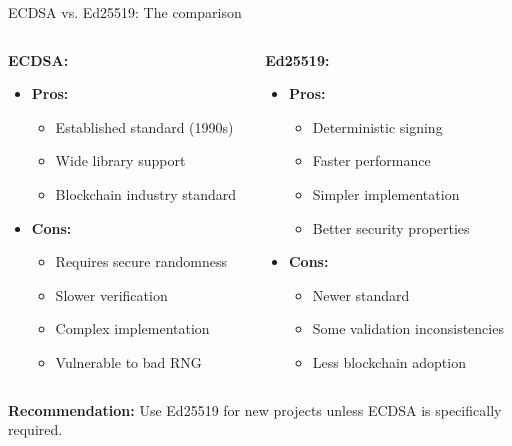 \documentclass[aspectratio=169, lualatex, handout]{beamer}
\begin{document}
\begin{frame}{ECDSA vs. Ed25519: The comparison}
	\begin{columns}
		\begin{column}{0.5\textwidth}
			\textbf{ECDSA:}
			\begin{itemize}[<+->]
				\item \textbf{Pros:}
				      \begin{itemize}
					      \item Established standard (1990s)
					      \item Wide library support
					      \item Blockchain industry standard
				      \end{itemize}
				\item \textbf{Cons:}
				      \begin{itemize}
					      \item Requires secure randomness
					      \item Slower verification
					      \item Complex implementation
					      \item Vulnerable to bad RNG
				      \end{itemize}
			\end{itemize}
		\end{column}
		\begin{column}{0.5\textwidth}
			\textbf{Ed25519:}
			\begin{itemize}[<+->]
				\item \textbf{Pros:}
				      \begin{itemize}
					      \item Deterministic signing
					      \item Faster performance
					      \item Simpler implementation
					      \item Better security properties
				      \end{itemize}
				\item \textbf{Cons:}
				      \begin{itemize}
					      \item Newer standard
					      \item Some validation inconsistencies
					      \item Less blockchain adoption
				      \end{itemize}
			\end{itemize}
		\end{column}
	\end{columns}
	\vspace{0.5cm}
	\textbf{Recommendation:} Use Ed25519 for new projects unless ECDSA is specifically required.
\end{frame}
\end{document}
